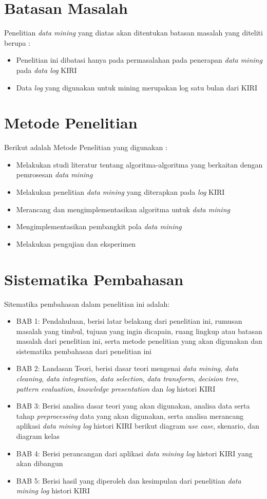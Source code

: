 \section{Batasan Masalah}
Penelitian \textsl{data mining} yang diatas akan ditentukan batasan masalah yang diteliti berupa : 
\begin{itemize}
	\item Penelitian ini dibatasi hanya pada permasalahan pada penerapan \textsl{data mining} pada \textsl{data log} KIRI
	\item Data \textsl{log} yang digunakan untuk mining merupakan log satu bulan dari KIRI
\end{itemize}

\section{Metode Penelitian}
Berikut adalah Metode Penelitian yang digunakan : 
	\begin{itemize}
		\item Melakukan studi literatur tentang algoritma-algoritma yang berkaitan dengan pemrosesan \textsl{data mining}
		\item Melakukan penelitian \textsl{data mining} yang diterapkan pada \textsl{log} KIRI
		\item Merancang dan mengimplementasikan algoritma untuk \textsl{data mining}
		\item Mengimplementasikan pembangkit pola \textsl{data mining}
		\item Melakukan pengujian dan eksperimen
	\end{itemize}

\section{Sistematika Pembahasan}
Sitematika pembahasan dalam penelitian ini adalah:
\begin{itemize}
	\item BAB 1: Pendahuluan, berisi latar belakang dari penelitian ini, rumusan masalah yang timbul, tujuan yang ingin dicapain, ruang lingkup atau batasan masalah dari penelitian ini, serta metode penelitian yang akan digunakan dan sistematika pembahasan dari penelitian ini
	\item BAB 2: Landasan Teori, berisi dasar teori mengenai \textsl{data mining}, \textsl{data cleaning}, \textsl{data integration}, \textsl{data selection}, \textsl{data transform}, \textsl{decision tree}, \textsl{pattern evaluation}, \textsl{knowledge presentation} dan \textsl{log} histori KIRI
	\item BAB 3: Berisi analisa dasar teori yang akan digunakan, analisa data serta tahap \textsl{preprocessing} data yang akan digunakan, serta analisa merancang aplikasi \textsl{data mining log} histori KIRI berikut diagram \textsl{use case}, skenario, dan diagram kelas
	\item BAB 4: Berisi perancangan dari aplikasi \textsl{data mining log} histori KIRI yang akan dibangun
	\item BAB 5: Berisi hasil yang diperoleh dan kesimpulan dari penelitian \textsl{data mining log} histori KIRI
\end{itemize}
